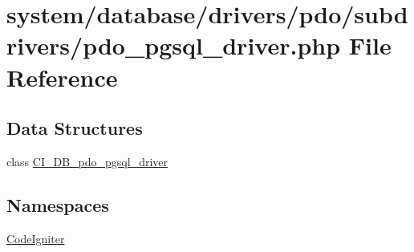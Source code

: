\hypertarget{pdo__pgsql__driver_8php}{}\section{system/database/drivers/pdo/subdrivers/pdo\+\_\+pgsql\+\_\+driver.php File Reference}
\label{pdo__pgsql__driver_8php}
\subsection*{Data Structures}
\begin{DoxyCompactItemize}
\item 
class \mbox{\hyperlink{class_c_i___d_b__pdo__pgsql__driver}{C\+I\+\_\+\+D\+B\+\_\+pdo\+\_\+pgsql\+\_\+driver}}
\end{DoxyCompactItemize}
\subsection*{Namespaces}
\begin{DoxyCompactItemize}
\item 
 \mbox{\hyperlink{namespace_code_igniter}{Code\+Igniter}}
\end{DoxyCompactItemize}

